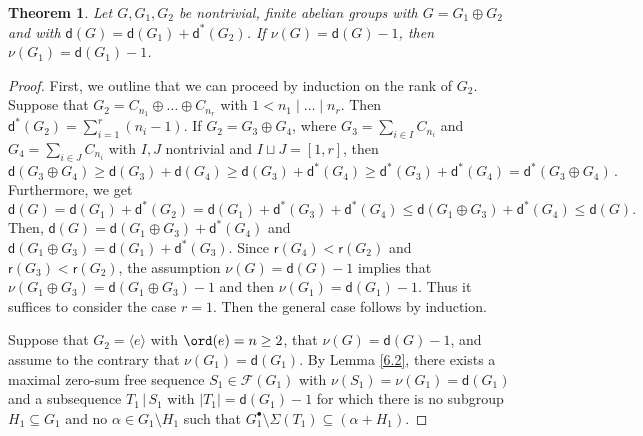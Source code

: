 \documentclass[a4paper, 10pt]{amsart}
\theoremstyle{plain}
\newtheorem{theorem}{\bf Theorem}[section]
\theoremstyle{definition}
\renewcommand{\t}{\, | \,}
\renewcommand{\t}{\, | \,}
\numberwithin{equation}{section}
\begin{document}
{\smallskip
\begin{theorem} \label{6.4}
Let $G, G_1, G_2$ be nontrivial, finite abelian groups with $G = G_1 \oplus G_2$ and with $\mathsf d (G) = \mathsf d (G_1) + \mathsf d^* (G_2)$. If $\nu (G) = \mathsf d (G)-1$, then $\nu (G_1) = \mathsf d (G_1) - 1$.
\end{theorem}

\begin{proof}
First, we outline that we can proceed by induction on the rank of $G_2$. Suppose that $G_2 = C_{n_1} \oplus \ldots \oplus C_{n_r}$ with $1 < n_1 \mid \ldots \mid n_r$. Then $\mathsf d^* (G_2) = \sum_{i=1}^r (n_i-1)$. 
If $G_2 = G_3 \oplus G_4$, where $G_3 = \sum_{i \in I} C_{n_i}$ and $G_4 = \sum_{i \in J} C_{n_i}$ with $I, J$ nontrivial and $I \sqcup J = [1,r]$, then 
\[
\mathsf d (G_3 \oplus G_4) \ge \mathsf d (G_3) + \mathsf d (G_4) \ge \mathsf d (G_3)+\mathsf d^* (G_4) \ge \mathsf d^* (G_3)+\mathsf d^* (G_4) = \mathsf d^* (G_3 \oplus G_4) \,.
\]
Furthermore, we get
\[
		\mathsf d (G)= \mathsf d (G_1) + \mathsf d^* (G_2) =\mathsf d (G_1) + \mathsf d^* (G_3) + \mathsf d^* (G_4)\le \mathsf d (G_1 \oplus G_3) + \mathsf d^* (G_4)\le \mathsf d (G).
\]
Then,
		$
		\mathsf d (G) = \mathsf d (G_1 \oplus G_3) + \mathsf d^* (G_4)$ and $\mathsf d (G_1 \oplus G_3) = \mathsf d (G_1) + \mathsf d^* (G_3) .$
		Since $\mathsf r (G_4) < \mathsf r (G_2)$ and $\mathsf r (G_3) < \mathsf r (G_2)$,  the assumption $\nu (G) = \mathsf d (G) - 1$ implies that $\nu (G_1 \oplus G_3) = \mathsf d (G_1 \oplus G_3) - 1$ and then $\nu (G_1) = \mathsf d (G_1) - 1$.  Thus it suffices to consider the case $r = 1$.
 Then the general case follows by induction. 

Suppose that $G_2 = \langle e \rangle$ with $\ord (e)=n \ge 2$, that $\nu (G) = \mathsf d (G)-1$, and assume to the contrary that  $\nu (G_1) = \mathsf d (G_1)$. By Lemma \ref{6.2}, there exists a maximal zero-sum free sequence $S_1 \in \mathcal F (G_1)$ with $\nu (S_1) = \nu (G_1) = \mathsf d (G_1)$ and a subsequence  $T_1\t S_1$ with $|T_1|=\mathsf d(G_1)-1$ for which there is no subgroup  $H_1 \subseteq G_1$ and no $\alpha\in G_1\setminus H_1$ such  that $G_1^{\bullet} \setminus \Sigma (T_1)\subseteq  (\alpha+H_1)$.


\end{proof}}
\end{document}
